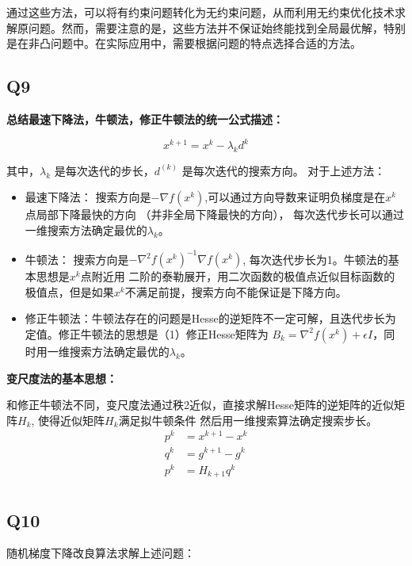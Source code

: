 \documentclass{article}
\begin{document}
通过这些方法，可以将有约束问题转化为无约束问题，从而利用无约束优化技术求解原问题。然而，需要注意的是，这些方法并不保证始终能找到全局最优解，特别是在非凸问题中。在实际应用中，需要根据问题的特点选择合适的方法。



    
    

    \subsection*{Q9}
    \textbf{总结最速下降法，牛顿法，修正牛顿法的统一公式描述：}

    \begin{equation*}
        x^{k+1} = x^{k} - \lambda_k d^{k}
    \end{equation*}

    其中，$\lambda_k$ 是每次迭代的步长，$d^{(k)}$ 是每次迭代的搜索方向。
    对于上述方法：

    \begin{itemize}
        \item 最速下降法： 搜索方向是$-\nabla f(x^k)$,可以通过方向导数来证明负梯度是在$x^k$点局部下降最快的方向
        （并非全局下降最快的方向）， 每次迭代步长可以通过一维搜索方法确定最优的$\lambda_k$。
        \item 牛顿法： 搜索方向是$-\nabla^2 f(x^k)^{-1} \nabla f(x^k)$, 每次迭代步长为1。牛顿法的基本思想是$x^k$点附近用
        二阶的泰勒展开，用二次函数的极值点近似目标函数的极值点，但是如果$x^k$不满足前提，搜索方向不能保证是下降方向。
        \item 修正牛顿法：牛顿法存在的问题是Hesse的逆矩阵不一定可解，且迭代步长为定值。修正牛顿法的思想是（1）修正Hesse矩阵为
        $B_k = \nabla^2f(x^k) + \epsilon I$，同时用一维搜索方法确定最优的$\lambda_k$。
    \end{itemize}

    \textbf{变尺度法的基本思想：}

    和修正牛顿法不同，变尺度法通过秩2近似，直接求解Hesse矩阵的逆矩阵的近似矩阵$H_k$, 使得近似矩阵$H_k$满足拟牛顿条件
    然后用一维搜索算法确定搜索步长。
    \begin{align*}
        p^k &= x^{k+1}- x^{k} \\
        q^k &= g^{k+1}- g^{k} \\
        p^k &= H_{k+1}q^k \\ 
    \end{align*}

    \subsection*{Q10}
    随机梯度下降改良算法求解上述问题：
    
\end{document}
